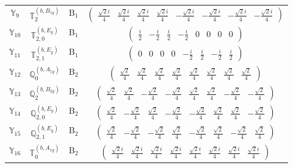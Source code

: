 \documentclass[fleqn,10pt,landscape]{article}
\begin{document}
\begin{itemize}
\begin{center}
\begin{longtable}{c|c|c|c}
$ \mathbb{Y}_{9} $ & $\mathbb{T}_{2}^{(b,B_{1g})}$ & B$_{1}$ & $\begin{pmatrix} \frac{\sqrt{2} i}{4} & \frac{\sqrt{2} i}{4} & \frac{\sqrt{2} i}{4} & \frac{\sqrt{2} i}{4} & - \frac{\sqrt{2} i}{4} & - \frac{\sqrt{2} i}{4} & - \frac{\sqrt{2} i}{4} & - \frac{\sqrt{2} i}{4} \end{pmatrix}$ \\
$ \mathbb{Y}_{10} $ & $\mathbb{T}_{2,0}^{(b,E_{g})}$ & B$_{1}$ & $\begin{pmatrix} \frac{i}{2} & - \frac{i}{2} & \frac{i}{2} & - \frac{i}{2} & 0 & 0 & 0 & 0 \end{pmatrix}$ \\
$ \mathbb{Y}_{11} $ & $\mathbb{T}_{2,1}^{(b,E_{g})}$ & B$_{1}$ & $\begin{pmatrix} 0 & 0 & 0 & 0 & - \frac{i}{2} & \frac{i}{2} & - \frac{i}{2} & \frac{i}{2} \end{pmatrix}$ \\ \hline
$ \mathbb{Y}_{12} $ & $\mathbb{Q}_{0}^{(b,A_{1g})}$ & B$_{2}$ & $\begin{pmatrix} \frac{\sqrt{2}}{4} & \frac{\sqrt{2}}{4} & \frac{\sqrt{2}}{4} & \frac{\sqrt{2}}{4} & \frac{\sqrt{2}}{4} & \frac{\sqrt{2}}{4} & \frac{\sqrt{2}}{4} & \frac{\sqrt{2}}{4} \end{pmatrix}$ \\
$ \mathbb{Y}_{13} $ & $\mathbb{Q}_{2}^{(b,B_{2g})}$ & B$_{2}$ & $\begin{pmatrix} \frac{\sqrt{2}}{4} & \frac{\sqrt{2}}{4} & - \frac{\sqrt{2}}{4} & - \frac{\sqrt{2}}{4} & \frac{\sqrt{2}}{4} & \frac{\sqrt{2}}{4} & - \frac{\sqrt{2}}{4} & - \frac{\sqrt{2}}{4} \end{pmatrix}$ \\
$ \mathbb{Y}_{14} $ & $\mathbb{Q}_{2,0}^{(b,E_{g})}$ & B$_{2}$ & $\begin{pmatrix} \frac{\sqrt{2}}{4} & - \frac{\sqrt{2}}{4} & \frac{\sqrt{2}}{4} & - \frac{\sqrt{2}}{4} & - \frac{\sqrt{2}}{4} & \frac{\sqrt{2}}{4} & \frac{\sqrt{2}}{4} & - \frac{\sqrt{2}}{4} \end{pmatrix}$ \\
$ \mathbb{Y}_{15} $ & $\mathbb{Q}_{2,1}^{(b,E_{g})}$ & B$_{2}$ & $\begin{pmatrix} \frac{\sqrt{2}}{4} & - \frac{\sqrt{2}}{4} & - \frac{\sqrt{2}}{4} & \frac{\sqrt{2}}{4} & - \frac{\sqrt{2}}{4} & \frac{\sqrt{2}}{4} & - \frac{\sqrt{2}}{4} & \frac{\sqrt{2}}{4} \end{pmatrix}$ \\
$ \mathbb{Y}_{16} $ & $\mathbb{T}_{0}^{(b,A_{1g})}$ & B$_{2}$ & $\begin{pmatrix} \frac{\sqrt{2} i}{4} & \frac{\sqrt{2} i}{4} & \frac{\sqrt{2} i}{4} & \frac{\sqrt{2} i}{4} & \frac{\sqrt{2} i}{4} & \frac{\sqrt{2} i}{4} & \frac{\sqrt{2} i}{4} & \frac{\sqrt{2} i}{4} \end{pmatrix}$ \\

\end{longtable}
\end{center}
\end{itemize}
\end{document}
